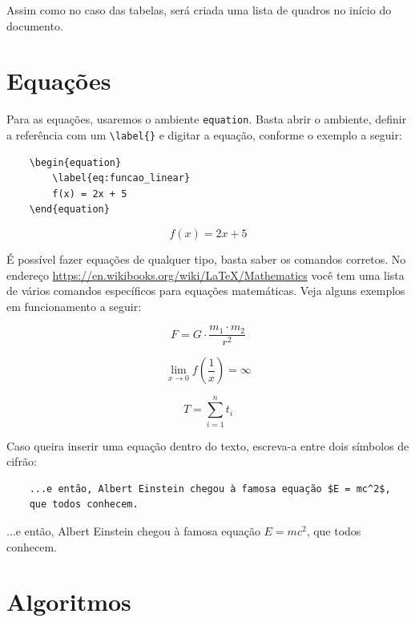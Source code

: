 Assim como no caso das tabelas, será criada uma lista de quadros no início do documento.

\section{Equações}
\label{sec:equacoes}

Para as equações, usaremos o ambiente \verb=equation=. Basta abrir o ambiente, definir a referência com um \verb=\label{}= e digitar a equação, conforme o exemplo a seguir:

\begin{verbatim}
    \begin{equation}
        \label{eq:funcao_linear}
        f(x) = 2x + 5
    \end{equation}
\end{verbatim}

\begin{equation}
    \label{eq:funcao_linear}
    f(x) = 2x + 5
\end{equation}

É possível fazer equações de qualquer tipo, basta saber os comandos corretos. No endereço \url{https://en.wikibooks.org/wiki/LaTeX/Mathematics} você tem uma lista de vários comandos específicos para equações matemáticas. Veja alguns exemplos em funcionamento a seguir:

\begin{equation}
    \label{eq:gravidade}
    F = G \cdot \frac{m_1 \cdot m_2}{r^2}
\end{equation}

\begin{equation}
    \label{eq:limites}
    \lim\limits_{x \to 0} f\left(\frac{1}{x}\right) = \infty
\end{equation}

\begin{equation}
    \label{eq:somatorio}
    T = \sum_{i=1}^{n} t_i
\end{equation}

Caso queira inserir uma equação dentro do texto, escreva-a entre dois símbolos de cifrão:

\begin{verbatim}
    ...e então, Albert Einstein chegou à famosa equação $E = mc^2$,
    que todos conhecem.
\end{verbatim}

...e então, Albert Einstein chegou à famosa equação $E = mc^2$, que todos conhecem.

\section{Algoritmos}
\label{sec:algoritmos}

